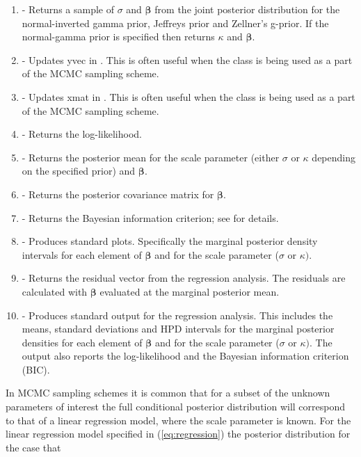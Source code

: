 \documentclass[article]{jss}
\begin{document}
\begin{enumerate}
\item {} - Returns a sample of $\sigma$ and $\bm{\beta}$
  from the joint posterior distribution for the normal-inverted gamma
  prior, Jeffreys prior and Zellner's g-prior. If the normal-gamma
  prior is specified then  returns $\kappa$ and
  $\bm{\beta}.$
\item {} - Updates yvec in
  . This is often useful when the class is being
  used as a part of the MCMC sampling scheme.
\item {} - Updates xmat in
  . This is often useful when the class is being
  used as a part of the MCMC sampling scheme.
\item {} - Returns the log-likelihood.
\item {} - Returns the posterior mean for the
  scale parameter (either $\sigma$ or $\kappa$ depending on the
  specified prior) and $\bm{\beta}.$
\item {} - Returns the posterior
  covariance matrix for $\bm{\beta}$.
\item {} - Returns the Bayesian information criterion; see
  \cite{KassRaftery1995} for details.
\item {} - Produces standard plots.
  Specifically the marginal posterior density intervals for each
  element of $\bm{\beta}$ and for the scale parameter ($\sigma$ or
  $\kappa)$.
\item {} - Returns the residual vector from the
  regression analysis.  The residuals are calculated with $\bm{\beta}$
  evaluated at the marginal posterior mean.
\item {} - Produces standard output for the regression
  analysis.  This includes the means, standard deviations and HPD
  intervals for the marginal posterior densities for each element of
  $\bm{\beta}$ and for the scale parameter ($\sigma$ or $\kappa)$. The
  output also reports the log-likelihood and the Bayesian information
  criterion (BIC).
\end{enumerate}
In MCMC sampling schemes it is common that for a subset of the unknown
parameters of interest the full conditional posterior distribution
will correspond to that of a linear regression model, where the scale
parameter is known. For the linear regression model specified in
(\ref{eq:regression}) the posterior distribution for the case that
\end{document}
